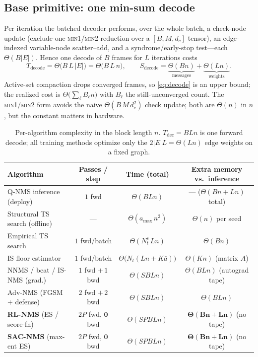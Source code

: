 \subsection{Base primitive: one min-sum decode}
Per iteration the batched decoder performs, over the whole batch, a check-node
update (exclude-one \textsc{min1/min2} reduction over a $[B,M,d_c]$ tensor), an
edge-indexed variable-node scatter--add, and a syndrome/early-stop test---each
$\Theta(B|E|)$. Hence one decode of $B$ frames for $L$ iterations costs
\begin{equation}
T_{\mathrm{decode}}=\Theta\!\big(B\,L\,|E|\big)=\Theta\!\big(B\,L\,n\big),
\qquad
S_{\mathrm{decode}}=\underbrace{\Theta(Bn)}_{\text{messages}}+\underbrace{\Theta(Ln)}_{\text{weights}}.
\label{eq:decode}
\end{equation}
Active-set compaction drops converged frames, so \eqref{eq:decode} is an upper
bound; the realized cost is $\Theta\!\big(\sum_\ell B_\ell n\big)$ with $B_\ell$
the still-unconverged count. The \textsc{min1/min2} form avoids the naive
$\Theta(B\,M\,d_c^{2})$ check update; both are $\Theta(n)$ in $n$, but the
constant matters in hardware.

\begin{table}[t]
\centering
\caption{Per-algorithm complexity in the block length $n$. $T_{\mathrm{dec}}=BLn$
is one forward decode; all training methods optimize only the $2|E|L=\Theta(Ln)$
edge weights on a fixed graph.}
\label{tab:algo-complexity}
\small
\renewcommand{\arraystretch}{1.25}
\begin{tabular}{@{}lccc@{}}
\toprule
Algorithm & Passes / step & Time (total) & Extra memory vs.\ inference \\
\midrule
Q-NMS inference (deploy)          & $1$ fwd                & $\Theta(BLn)$                 & --- \; ($\Theta(Bn{+}Ln)$ total) \\
Structural TS search (offline)    & ---                    & $\Theta(a_{\max}\,n^{2})$     & $\Theta(n)$ per seed \\
Empirical TS search               & $1$ fwd/batch          & $\Theta(N_t^{\mathrm{s}}\,Ln)$& $\Theta(Bn)$ \\
IS floor estimator                & $1$ fwd/batch          & $\Theta\!\big(N_t(Ln{+}K\bar a)\big)$ & $\Theta(Kn)$ (matrix $A$) \\
NNMS / beat / IS-NMS (grad.)      & $1$ fwd $+\,1$ bwd     & $\Theta(SBLn)$               & $\Theta(BLn)$ (autograd tape) \\
Adv-NMS (FGSM $+$ defense)        & $2$ fwd $+\,2$ bwd     & $\Theta(SBLn)$               & $\Theta(BLn)$ \\
\textbf{RL-NMS} (ES / score-fn)   & $2P$ fwd, $\mathbf{0}$ bwd & $\Theta(SPBLn)$          & $\boldsymbol{\Theta(Bn{+}Ln)}$ (no tape) \\
\textbf{SAC-NMS} (max-ent ES)     & $2P$ fwd, $\mathbf{0}$ bwd & $\Theta(SPBLn)$          & $\boldsymbol{\Theta(Bn{+}Ln)}$ (no tape) \\
\bottomrule
\end{tabular}
\end{table}

